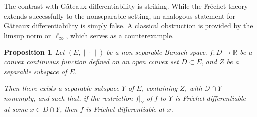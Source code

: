 \documentclass[12pt]{amsart}
\theoremstyle{plain}
\newtheorem{proposition}[theorem]{Proposition}
\theoremstyle{definition}
\theoremstyle{remark}
\def\nn{\|\cdot\|}
\def\R{{\mathbb R}}
\def\nn{\|\cdot\|}
\begin{document}
The contrast with G\^ateaux differentiability is striking. While the Fr\'echet theory extends successfully to the nonseparable setting, an analogous statement for G\^ateaux differentiability is simply false. A classical obstruction is provided by the limsup norm on $\ell_\infty$, which serves as a counterexample.
\begin{proposition}\label{g}
Let $(E,\nn)$ be a non-separable Banach space, $f:D\rightarrow\R$ be a  convex continuous function
defined on an open convex set $D\subset E$, and $Z$ be a separable subspace of $E$.

\noindent Then there exists a separable subspace $Y$ of $E$, containing $Z$, with $D\cap Y$ nonempty, and such that, if
the restriction $f|_Y$ of $f$ to $Y$ is Fr\'echet differentiable at some $x\in D\cap Y$, then  $f$ is
Fr\'echet differentiable at $x$.
\end{proposition}
\end{document}

